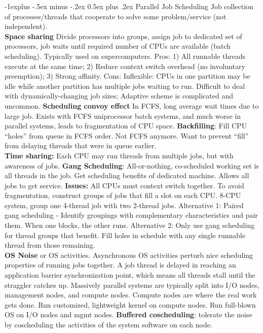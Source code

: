 \documentclass[9pt,landscape]{article}
\makeatletter
\renewcommand{\subsection}{\@startsection{subsection}{2}{0mm}%
                                {-1explus -.5ex minus -.2ex}%
                                {0.5ex plus .2ex}%
                                {\normalfont\normalsize\bfseries}}
\makeatother
\begin{document}
\raggedright
\footnotesize
\begin{multicols}{3}


\setlength{\premulticols}{1pt}
\setlength{\postmulticols}{1pt}
\setlength{\multicolsep}{1pt}
\setlength{\columnsep}{2pt}

\subsection{Parallel Job Scheduling}
Job collection of processes/threads that cooperate to solve some problem/service (not independent).\\
{\bf Space sharing} Divide processors into groups, assign job to dedicated set of processors, job waits until required number of CPUs are available (batch scheduling). Typically used on supercomputers.
Pros: 1) All runnable threads execute at the same time; 2) Reduce context switch overhead (no involuntary preemption); 3) Strong affinity. 
Cons: Inflexible: CPUs in one partition may be idle while another partition has multiple jobs waiting to run. Difficult to deal with dynamically-changing job sizes; Adaptive scheme is complicated and uncommon.
{\bf Scheduling convoy effect} In FCFS, long average wait times due to large job. Exists with FCFS uniprocessor batch systems, and much worse in parallel systems, leads to fragmentation of CPU space.
{\bf Backfilling}: Fill CPU “holes” from queue in FCFS order. Not FCFS anymore. Want to prevent ``fill'' from delaying threads that were in queue earlier.\\
{\bf Time sharing:} Each CPU may run threads from multiple jobs, but with awareness of jobs.
{\bf Gang Scheduling}: All-or-nothing, co-scheduled working set is all threads in the job. Get scheduling benefits of dedicated machine. Allows all jobs to get service. {\bf Issues:} All CPUs must context switch together. To avoid fragmentation, construct groups of jobs that fill a slot on each CPU. 8-CPU system, group one 4-thread job with two 2-thread jobs. Alternative 1: Paired gang scheduling - Identify groupings with complementary characteristics and pair them. When one blocks, the other runs. Alternative 2: Only use gang scheduling for thread groups that benefit. Fill holes in schedule with any single runnable thread from those remaining.\\
{\bf OS Noise} or OS activities. Asynchronous OS activities perturb nice scheduling properties of running jobs together. A job thread is delayed in reaching an application barrier synchronization point, which means all threads stall until the straggler catches up. Massively parallel systems are typically split into I/O nodes, management nodes, and compute nodes. Compute nodes are where the real work gets done. Run customized, lightweight kernel on compute nodes. Run full-blown OS on I/O nodes and mgmt nodes. {\bf Buffered coscheduling}: tolerate the noise by coscheduling the activities of the system software on each node.


\end{multicols}
\end{document}
